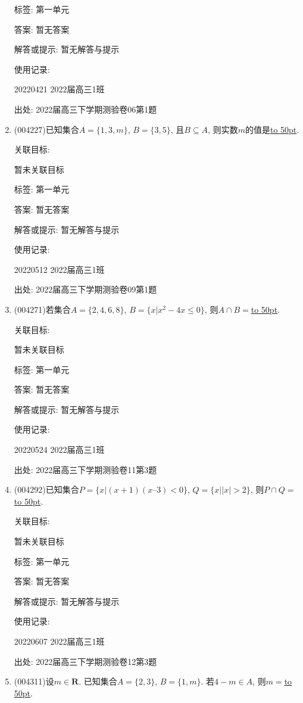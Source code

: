\documentclass[10pt,a4paper]{article}
\newcommand{\blank}[1]{\underline{\hbox to #1pt{}}}
\begin{document}
\begin{enumerate}[1.]
标签: 第一单元

答案: 暂无答案

解答或提示: 暂无解答与提示

使用记录:

20220421	2022届高三1班	


出处: 2022届高三下学期测验卷06第1题
\item { (004227)}已知集合$A=\{1,3,m\}$, $B=\{3,5\}$, 且$B\subseteq A$, 则实数$m$的值是\blank{50}.


关联目标:

暂未关联目标



标签: 第一单元

答案: 暂无答案

解答或提示: 暂无解答与提示

使用记录:

20220512	2022届高三1班	


出处: 2022届高三下学期测验卷09第1题
\item { (004271)}若集合$A=\{2,4,6,8\}$, $B=\{x|x^2-4x\le 0\}$, 则$A\cap B=$\blank{50}.


关联目标:

暂未关联目标



标签: 第一单元

答案: 暂无答案

解答或提示: 暂无解答与提示

使用记录:

20220524	2022届高三1班	


出处: 2022届高三下学期测验卷11第3题
\item { (004292)}已知集合$P=\{x|(x+1)(x–3)<0\}$, $Q=\{x||x|>2\}$, 则$P\cap Q=$\blank{50}.


关联目标:

暂未关联目标



标签: 第一单元

答案: 暂无答案

解答或提示: 暂无解答与提示

使用记录:

20220607	2022届高三1班	


出处: 2022届高三下学期测验卷12第3题
\item { (004311)}设$m\in \mathbf{R}$. 已知集合$A=\{2,3\}$, $B=\{1,m\}$. 若$4-m\in A$, 则$m=$\blank{50}.



\end{enumerate}
\end{document}
